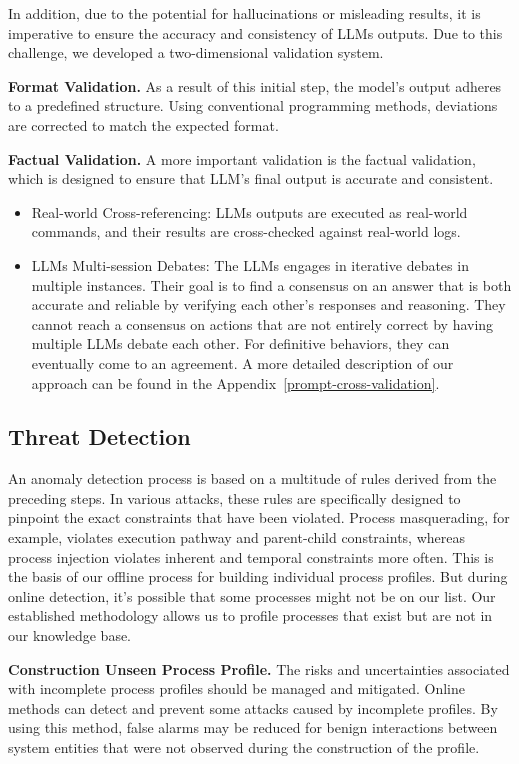 In addition, due to the potential for hallucinations or misleading results, it is imperative to ensure the accuracy and consistency of LLMs outputs. Due to this challenge, we developed a two-dimensional validation system.

\textbf{Format Validation.}
As a result of this initial step, the model's output adheres to a predefined structure. Using conventional programming methods, deviations are corrected to match the expected format.

\textbf{Factual Validation.}
A more important validation is the factual validation, which is designed to ensure that LLM's final output is accurate and consistent.

\begin{itemize}
    \item Real-world Cross-referencing: LLMs outputs are executed as real-world commands, and their results are cross-checked against real-world logs.
    \item LLMs Multi-session Debates: The LLMs engages in iterative debates in multiple instances. Their goal is to find a consensus on an answer that is both accurate and reliable by verifying each other's responses and reasoning. They cannot reach a consensus on actions that are not entirely correct by having multiple LLMs debate each other. For definitive behaviors, they can eventually come to an agreement. A more detailed description of our approach can be found in the Appendix~\ref{prompt-cross-validation}.
\end{itemize}



\subsection{Threat Detection}
\label{sec:Threat_detection}
An anomaly detection process is based on a multitude of rules derived from the preceding steps. In various attacks, these rules are specifically designed to pinpoint the exact constraints that have been violated. Process masquerading, for example, violates execution pathway and parent-child constraints, whereas process injection violates inherent and temporal constraints more often. This is the basis of our offline process for building individual process profiles. But during online detection, it's possible that some processes might not be on our list.
Our established methodology allows us to profile processes that exist but are not in our knowledge base.

\textbf{Construction Unseen Process Profile.}
The risks and uncertainties associated with incomplete process profiles should be managed and mitigated. Online methods can detect and prevent some attacks caused by incomplete profiles. By using this method, false alarms may be reduced for benign interactions between system entities that were not observed during the construction of the profile.